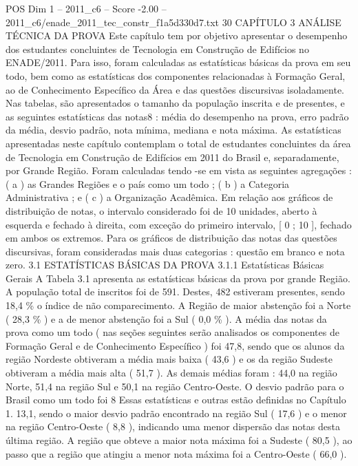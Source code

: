 \begin{textsample}{POS Dim 1 – 2011\_c6 – Score -2.00 – 2011\_c6/enade\_2011\_tec\_constr\_f1a5d330d7.txt}  \label{ex:f1_pos_215}
30 CAPÍTULO 3 ANÁLISE TÉCNICA DA PROVA Este capítulo tem por objetivo apresentar o desempenho dos estudantes concluintes de Tecnologia em Construção de Edifícios no ENADE/2011.
Para isso, foram calculadas as estatísticas básicas da prova em seu todo, bem como as estatísticas dos componentes relacionadas à Formação Geral, ao de Conhecimento Específico da Área e das questões discursivas isoladamente.
Nas tabelas, são apresentados o tamanho da população inscrita e de presentes, e as seguintes estatísticas das notas8 : média do desempenho na prova, erro padrão da média, desvio padrão, nota mínima, mediana e nota máxima.
As estatísticas apresentadas neste capítulo contemplam o total de estudantes concluintes da área de Tecnologia em Construção de Edifícios em 2011 do Brasil e, separadamente, por Grande Região.
Foram calculadas tendo -se em vista as seguintes agregações : ( a ) as Grandes Regiões e o país como um todo ; ( b ) a Categoria Administrativa ; e ( c ) a Organização Acadêmica.
Em relação aos gráficos de distribuição de notas, o intervalo considerado foi de 10 unidades, aberto à esquerda e fechado à direita, com exceção do primeiro intervalo, [ 0 ; 10 ], fechado em ambos os extremos.
Para os gráficos de distribuição das notas das questões discursivas, foram consideradas mais duas categorias : questão em branco e nota zero. 3.1 ESTATÍSTICAS BÁSICAS DA PROVA 3.1.1 Estatísticas Básicas Gerais A Tabela 3.1 apresenta as estatísticas básicas da prova por grande Região.
A população total de inscritos foi de 591.
Destes, 482 estiveram presentes, sendo 18,4 \% o índice de não comparecimento.
A Região de maior abstenção foi a Norte ( 28,3 \% ) e a de menor abstenção foi a Sul ( 0,0 \% ).
A média das notas da prova como um todo ( nas seções seguintes serão analisados os componentes de Formação Geral e de Conhecimento Específico ) foi 47,8, sendo que os alunos da região Nordeste obtiveram a média mais baixa ( 43,6 ) e os da região Sudeste obtiveram a média mais alta ( 51,7 ).
As demais médias foram : 44,0 na região Norte, 51,4 na região Sul e 50,1 na região Centro-Oeste.
O desvio padrão para o Brasil como um todo foi 8 Essas estatísticas e outras estão definidas no Capítulo 1. 13,1, sendo o maior desvio padrão encontrado na região Sul ( 17,6 ) e o menor na região Centro-Oeste ( 8,8 ), indicando uma menor dispersão das notas desta última região.
A região que obteve a maior nota máxima foi a Sudeste ( 80,5 ), ao passo que a região que atingiu a menor nota máxima foi a Centro-Oeste ( 66,0 ).

\end{textsample}
